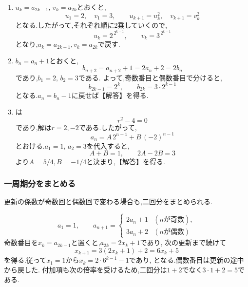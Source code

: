   \noindent{}\par\nobreak
  \begin{enumerate}[label=(\arabic*),parsep=3pt,format=\bookitemlink{example-nonadjacent-1}{solution}{problem}]
    \item $u_k=a_{2k-1},\,v_k=a_{2k}$とおくと,
          \[
            u_1=2,\quad v_1=3,\qquad
            u_{k+1}=u_k^2,\quad v_{k+1}=v_k^2
          \]
          となる.したがって,それぞれ順に2乗していくので,
          \[
            u_k=2^{\,2^{k-1}},\qquad v_k=3^{\,2^{k-1}}
          \]
          となり,$u_k=a_{2k-1},v_k=a_{2k}$で戻す.
    \item $b_n=a_n+1$とおくと,
          \[
            b_{n+2}=a_{n+2}+1=2a_n+2=2b_n
          \]
          であり,$b_1=2,\,b_2=3$である.
          よって,奇数番目と偶数番目で分けると,
          \[
            b_{2k-1}=2^k,\qquad b_{2k}=3\cdot2^{k-1}
          \]
          となる.$a_n=b_n-1$に戻せば【解答】を得る.
    \item {}は
          \[
            r^2-4=0
          \]
          であり,解は$r=2,-2$である.したがって,
          \[
            a_n=A\,2^{n-1}+B\,(-2)^{n-1}
          \]
          とおける.$a_1=1,\,a_2=3$を代入すると,
          \[
            A+B=1,\qquad 2A-2B=3
          \]
          より$A=5/4,B=-1/4$と決まり,【解答】を得る.
  \end{enumerate}

  \subsubsection{一周期分をまとめる}\label{節：周期的な係数}
  更新の係数が奇数回と偶数回で変わる場合も,二回分をまとめられる.

  \[
    a_1=1,\qquad
    a_{n+1}=\begin{cases}
      2a_n+1&(n\text{が奇数}),\\
      3a_n+2&(n\text{が偶数})
    \end{cases}
  \]
  奇数番目を$x_k=a_{2k-1}$と置くと,$a_{2k}=2x_k+1$であり,
  次の更新まで続けて
  \[
    x_{k+1}=3(2x_k+1)+2=6x_k+5
  \]
  を得る.従って$x_1=1$から$x_k=2\cdot6^{k-1}-1$であり,
  \BookMathLayout{\[
    a_{2k-1}=2\cdot6^{k-1}-1,\qquad
    a_{2k}=4\cdot6^{k-1}-1\quad(k\ge1)
  \]}{\[
    \begin{aligned}
      a_{2k-1}&=2\cdot6^{k-1}-1,\\
      a_{2k}&=4\cdot6^{k-1}-1\quad(k\ge1)
    \end{aligned}
  \]}
  となる.偶数番目は更新の途中から戻した.
  付加項も次の倍率を受けるため,二回分は$1+2$でなく$3\cdot1+2=5$である.

